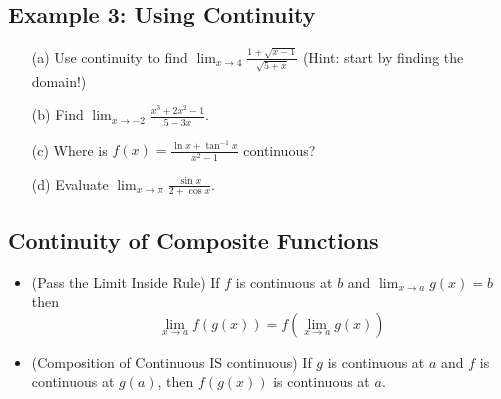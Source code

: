 \documentclass[10pt]{book}
\theoremstyle{definition}
\begin{document}
\subsection*{Example 3: Using Continuity}
\begin{itemize}
    \item[(a)] Use continuity to find $\displaystyle \lim_{x\rightarrow 4}\frac{1+\sqrt{x-1}}{\sqrt{5+x}}$ (Hint: start by finding the domain!)\vspace{3cm}
    \item[(b)] Find $\displaystyle\lim_{x\rightarrow -2}\frac{x^3+2x^2-1}{5-3x}$.\vspace{4cm}
    \item[(c)] Where is $\displaystyle f(x)=\frac{\ln x+\tan^{-1}x}{x^2-1}$ continuous?
    \vspace{4cm}
    \item[(d)] Evaluate $\displaystyle\lim_{x\rightarrow \pi}\frac{\sin x}{2+\cos x}$.
    \end{itemize}
    \raggedbottom
    \clearpage
    \begin{tcolorbox}
    \subsection*{Continuity of Composite Functions}
    \begin{itemize}
        \item (Pass the Limit Inside Rule) If $f$ is continuous at $b$ and $\displaystyle\lim_{x\rightarrow a}g(x)=b$ then
        \[
        \lim_{x\rightarrow a}f(g(x))=f\left(\lim_{x\rightarrow a}g(x)\right)
        \]
        \item (Composition of Continuous IS continuous) If $g$ is continuous at $a$ and $f$ is continuous at $g(a)$, then $f(g(x))$ is continuous at $a$.
    \end{itemize}
    \end{tcolorbox}
\end{document}
